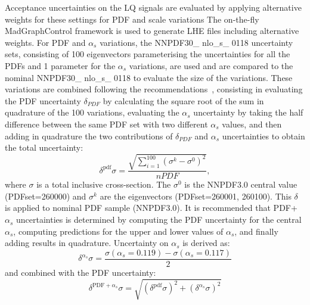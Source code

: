 Acceptance uncertainties on the LQ signals are evaluated by applying alternative weights for these settings for PDF and scale variations
The on-the-fly MadGraphControl framework is used to generate LHE files including alternative weights. For PDF and $\alpha_s$ variations, the NNPDF30\_ nlo\_s\_ 0118 uncertainty sets, consisting of 100 eigenvectors parameterising the uncertainties for all the PDFs and 1 parameter for the $\alpha_s$ variations, are used and are compared to the nominal NNPDF30\_ nlo\_s\_ 0118 to evaluate the size of the variations. %
These variations are combined following the recommendations~\cite{Butterworth:2015oua}, consisting in evaluating the PDF uncertainty $\delta_{PDF}$ by calculating the square root of the sum in quadrature of the 100 variations, evaluating the $\alpha_s$ uncertainty by taking the half difference between the same PDF set with two different $\alpha_s$ values, and then adding in quadrature the two contributions of $\delta_{PDF}$ and $\alpha_s$ uncertainties to obtain the total uncertainty:
\begin{equation}
    \delta^{\mathrm{pdf}}\sigma=\frac{\sqrt{\sum_{i=1}^{100}\left( \sigma^k - \sigma^0 \right)^2}}{nPDF},
\label{eq:PDFunc_LQSignal}
\end{equation}
where $\sigma$ is a total inclusive cross-section.
The $\sigma^0$ is the NNPDF3.0 central value (PDFset=260000) and  $\sigma^k$ are the eigenvectors (PDFset=260001, 260100).
This $\delta$ is applied to nominal PDF sample (NNPDF3.0).
It is recommended that PDF+$\alpha_s$ uncertainties is determined by computing the PDF uncertainty for the central $\alpha_s$, 
computing predictions for the upper and lower values of $\alpha_s$, 
and finally adding results in quadrature.
Uncertainty on $\alpha_s$ is derived as:
\begin{equation}
  \delta^{\alpha_s}\sigma=\frac{\sigma(\alpha_s=0.119)-\sigma(\alpha_s=0.117)}{2}
\end{equation}
and combined with the PDF uncertainty:
\begin{equation}
  \delta^{\mathrm{PDF}+\alpha_s}\sigma=\sqrt{(\delta^{\mathrm{pdf}}\sigma)^2+(\delta^{\alpha_s}\sigma)^2}
\end{equation}

